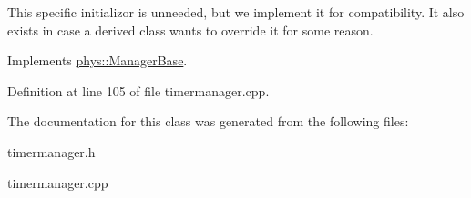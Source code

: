 This specific initializor is unneeded, but we implement it for compatibility. It also exists in case a derived class wants to override it for some reason. 

Implements \hyperlink{classphys_1_1ManagerBase_a57dd8e54e767427d5bdcc86dc66d73ed}{phys::ManagerBase}.



Definition at line 105 of file timermanager.cpp.



The documentation for this class was generated from the following files:\begin{DoxyCompactItemize}
\item 
timermanager.h\item 
timermanager.cpp\end{DoxyCompactItemize}
